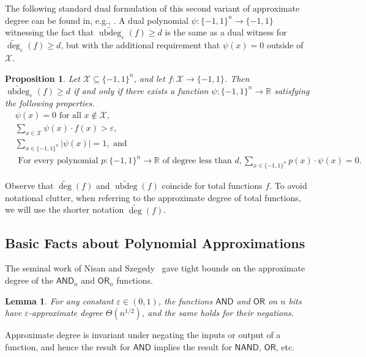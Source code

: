 \documentclass[11pt, letterpaper, fleqn]{article}
\newtheorem{lemma}[theorem]{Lemma}
\newtheorem{proposition}[theorem]{Proposition}
\theoremstyle{plain}
\newcommand{\genericdomain}{\mathcal{X}}
\newcommand{\R}{\mathbb{R}}
\newcommand{\OR}{\mathsf{ OR}}
\newcommand{\bits}{\{-1,1\}}
\newcommand{\eps}{\varepsilon}
\newcommand{\adeg}{\widetilde{\operatorname{deg}}}
\newcommand{\ubdeg}{\widetilde{\operatorname{ubdeg}}}
\newcommand{\AND}{\mathsf{AND}}
\begin{document}
The following standard dual formulation of this second variant of approximate degree
can be found in, e.g., \cite{patmat}. A dual polynomial $\psi : \bits^n \to \bits$ witnessing the fact that $\ubdeg_\eps(f) \ge d$ is the same as a dual witness for $\adeg_\eps(f) \ge d$, but with the additional requirement that $\psi(x) = 0$ outside of $\genericdomain$.

\begin{proposition} \label{prop:ub-duality}
Let $\genericdomain \subseteq \bits^n$, and let $f : \genericdomain \to \{-1,1\}$.
Then $\ubdeg_{\eps}(f) \geq d$ if and only if there exists a function 
$\psi \colon \bits^n \to \R$ satisfying the following properties.
\begin{align} \label{eq:ub-zero} &\psi(x) = 0 \text{ for all } x \not\in \genericdomain, \\
\label{eq:ub-corr} &\sum_{x \in \genericdomain}\psi(x) \cdot f(x) > \eps, \\
 \label{eq:ub-unitnorm} &\sum_{x \in \bits^n} |\psi(x)| = 1, \text{ and }  \\
 \label{eq:ub-phd} &\text{ For every polynomial } p \colon \bits^n \to \R \text{ of degree less than } d, \sum_{x \in \bits^n} p(x) \cdot \psi(x) = 0. 
\end{align}

\end{proposition}

Observe that $\adeg(f)$ and $\ubdeg(f)$ coincide for total functions $f$. To avoid notational
clutter, when referring to the approximate degree of total functions, we will
use the shorter notation $\adeg(f)$.

\subsection{Basic Facts about Polynomial Approximations}

The seminal work of Nisan and Szegedy~\cite{nisanszegedy} gave tight bounds on the approximate degree of the $\AND_n$ and $\OR_n$ functions.

\begin{lemma}
\label{andornor}
For any constant $\eps \in (0, 1)$, the functions $\AND$ and $\OR$ on $n$ bits have $\eps$-approximate degree $\Theta(n^{1/2})$,
and the same holds for their negations.
\end{lemma}

Approximate degree is invariant under negating the inputs or output of a function, and hence the result for $\AND$ implies the result for $\mathsf{NAND}$, $\OR$, etc.
\end{document}
